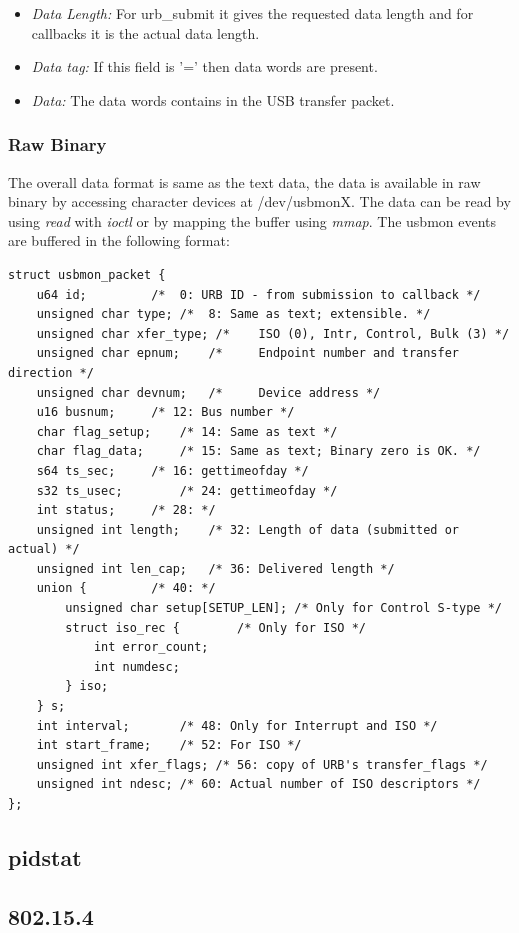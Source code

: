 \begin{itemize}
\item{\textit{Data Length:} For urb\_submit it gives the requested data length and for callbacks it is the actual data length.}

\item{\textit{Data tag:} If this field is '=' then data words are present.}

\item{\textit{Data:} The data words contains in the USB transfer packet.}
\end{itemize}

\subsubsection{Raw Binary}
The overall data format is same as the text data, the data is available in raw binary by accessing character devices at /dev/usbmonX. The data can be read by using \textit{read} with \textit{ioctl} or by mapping the buffer using \textit{mmap}. The usbmon events are buffered in the following format:

\begingroup
\centering\scriptsize\begin{lstlisting}
struct usbmon_packet {
	u64 id;			/*  0: URB ID - from submission to callback */
	unsigned char type;	/*  8: Same as text; extensible. */
	unsigned char xfer_type; /*    ISO (0), Intr, Control, Bulk (3) */
	unsigned char epnum;	/*     Endpoint number and transfer direction */
	unsigned char devnum;	/*     Device address */
	u16 busnum;		/* 12: Bus number */
	char flag_setup;	/* 14: Same as text */
	char flag_data;		/* 15: Same as text; Binary zero is OK. */
	s64 ts_sec;		/* 16: gettimeofday */
	s32 ts_usec;		/* 24: gettimeofday */
	int status;		/* 28: */
	unsigned int length;	/* 32: Length of data (submitted or actual) */
	unsigned int len_cap;	/* 36: Delivered length */
	union {			/* 40: */
		unsigned char setup[SETUP_LEN];	/* Only for Control S-type */
		struct iso_rec {		/* Only for ISO */
			int error_count;
			int numdesc;
		} iso;
	} s;
	int interval;		/* 48: Only for Interrupt and ISO */
	int start_frame;	/* 52: For ISO */
	unsigned int xfer_flags; /* 56: copy of URB's transfer_flags */
	unsigned int ndesc;	/* 60: Actual number of ISO descriptors */
};	
\end{lstlisting}
\endgroup


\subsection{pidstat}
\subsection{802.15.4}
